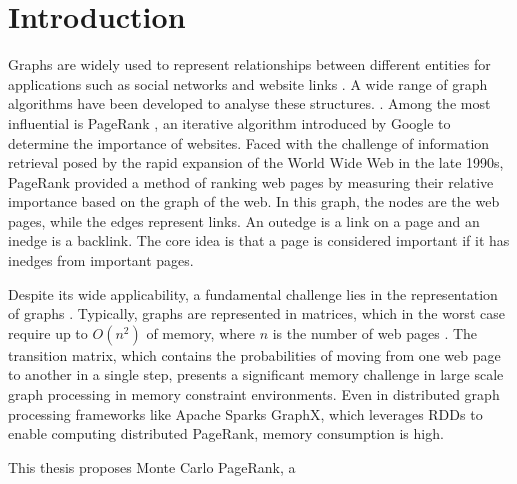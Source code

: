 \section{Introduction}


Graphs are widely used to represent relationships between different entities for applications such as social networks and website links \cite{zhang_distributed_2021}. 
A wide range of graph algorithms have been developed to analyse these structures. \cite{malewicz_pregel_2010}\cite{low_distributed_2012}\cite{koch_empirical_2016}. Among the most influential is PageRank \cite{page_pagerank_1999}, an iterative algorithm introduced by Google to determine the importance of websites. Faced with the challenge of information retrieval posed by the rapid expansion of the World Wide Web in the late 1990s, PageRank provided a method of ranking web pages by measuring their relative importance based on the graph of the web. In this graph, the nodes are the web pages, while the edges represent links. An outedge is a link on a page and an inedge is a backlink. The core idea is that a page is considered important if it has inedges from important pages.\par 
Despite its wide applicability, a fundamental challenge lies in the representation of graphs \cite{liu_fast_2015}. Typically, graphs are represented in matrices, which in the worst case require up to $O(n^2)$ of memory, where $n$ is the number of web pages \cite{wu_efficient_2024}. The transition matrix, which contains the probabilities of moving from one web page to another in a single step, presents a significant memory challenge in large scale graph processing in memory constraint environments. Even in distributed graph processing frameworks like Apache Sparks GraphX, which leverages RDDs to enable computing distributed PageRank, memory consumption is high. \par
This thesis proposes Monte Carlo PageRank, a


